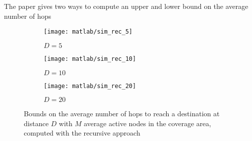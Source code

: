 \documentclass[a4paper,oneside]{article}
\begin{document}
The paper gives two ways to compute an upper and lower bound on the
average number of hops

\begin{figure}[htbp]
  \centering
  \begin{subfigure}{0.5\textwidth}
    \centering
    \texttt{[image: matlab/sim\_rec\_5]}
    \caption{$ D = 5 $}
    \label{plot:geraf_rec_5}
  \end{subfigure}%
  \begin{subfigure}{0.5\textwidth}
    \centering
    \texttt{[image: matlab/sim\_rec\_10]}
    \caption{$ D = 10 $}
    \label{plot:geraf_rec_10}
  \end{subfigure}
  \begin{subfigure}{0.5\textwidth}
    \centering
    \texttt{[image: matlab/sim\_rec\_20]}
    \caption{$ D = 20 $}
    \label{plot:geraf_rec_20}
  \end{subfigure}
  \caption{Bounds on the average number of hops to reach a destination
    at distance $D$ with $M$ average active nodes in the coverage
    area, computed with the recursive approach}
\end{figure}
\end{document}

